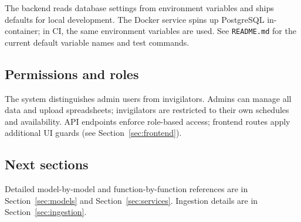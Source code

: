 The backend reads database settings from environment variables and ships defaults for local development. The Docker service spins up PostgreSQL in-container; in CI, the same environment variables are used. See \texttt{README.md} for the current default variable names and test commands.

\subsection{Permissions and roles}
\label{subsec:backend:roles}

The system distinguishes admin users from invigilators. Admins can manage all data and upload spreadsheets; invigilators are restricted to their own schedules and availability. API endpoints enforce role-based access; frontend routes apply additional UI guards (see Section~\ref{sec:frontend}).

\subsection{Next sections}
\label{subsec:backend:next}

Detailed model-by-model and function-by-function references are in Section~\ref{sec:models} and Section~\ref{sec:services}. Ingestion details are in Section~\ref{sec:ingestion}.
